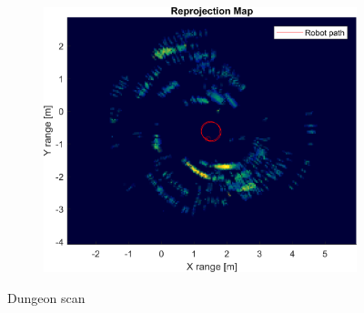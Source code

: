 \begin{figure}[htbp]
\begin{subfigure}[t]{0.475\linewidth}
    \end{subfigure}\bigskip\\
    \begin{subfigure}[t]{0.5\linewidth}   
        \centering 
        \includegraphics[width=\linewidth,max height=.475\textheight]{gfx/results/dungeon_reprojection.png}
    \end{subfigure}%
    \caption{Dungeon scan}
\end{figure}

